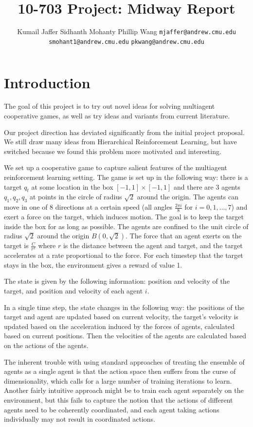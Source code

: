 \documentclass{article}
\title{10-703 Project: Midway Report}
\author{Kumail Jaffer \And Sidhanth Mohanty \And Phillip
Wang
\AND
\texttt{mjaffer@andrew.cmu.edu} \And
\texttt{smohant1@andrew.cmu.edu}\And
\texttt{pkwang@andrew.cmu.edu}}
\begin{document}
\maketitle

\section{Introduction}
The goal of this project is to try out novel ideas for
solving multiagent cooperative games, as well as try
ideas and variants from current literature.

Our project direction has deviated significantly from the
initial project proposal. We still draw many ideas from
Hierarchical Reinforcement Learning, but have switched because
we found this problem more motivated and interesting.

We set up a cooperative game to capture salient features
of the multiagent reinforcement learning setting.
The game is set up in the following way: there is a target
$q_t$ at some location in the box $[-1,1]\times[-1,1]$
and there are 3 agents $q_1,q_2,q_3$ at points in the circle of
radius $\sqrt{2}$ around the origin. The agents can move
in one of 8 directions at a certain speed (all angles
$\frac{2\pi i}{8}$ for $i=0,1,\ldots,7$) and exert a force
on the target, which induces motion. The goal is to
keep the target inside the box for as long as possible.
The agents are confined to the unit circle of radius
$\sqrt{2}$ around the origin $B(0,\sqrt{2})$.
The force that an agent exerts on the target is $\frac{C}{r^2}$
where $r$ is the distance between the agent and target, and
the target accelerates at a rate proportional to the force.
For each timestep that the target stays in the box, the
environment gives a reward of value 1.

The state is given by the following information: position and velocity
of the target, and position and velocity of each agent $i$.

In a single time step, the state changes in the following way:
the positions of the target and agent are updated based on
current velocity, the target's velocity is updated
based on the acceleration induced by the forces
of agents, calculated based on current positions. Then the
velocities of the agents are calculated based on the
actions of the agents.

The inherent trouble with using standard approaches of treating
the ensemble of agents as a single agent is that the action
space then suffers from the curse of dimensionality, which
calls for a large number of training iterations to
learn. Another fairly intuitive approach might be to
train each agent separately on the environment, but
this fails to capture the notion that the actions of
different agents need to be coherently coordinated,
and each agent taking actions individually may not
result in coordinated actions.
\end{document}
